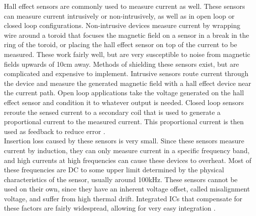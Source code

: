 \newline
Hall effect sensors are commonly used to measure current as well. These sensors can measure current intrusively or non-intrusively, as well as in open loop or closed loop configurations. Non-intrusive devices measure current by wrapping wire around a toroid that focuses the magnetic field on a sensor in a break in the ring of the toroid, or placing the hall effect sensor on top of the current to be measured. These work fairly well, but are very susceptible to noise from magnetic fields upwards of 10cm away. Methods of shielding these sensors exist, but are complicated and expensive to implement. Intrusive sensors route current through the device and measure the generated magnetic field with a hall effect device near the current path. Open loop applications take the voltage generated on the hall effect sensor and condition it to whatever output is needed. Closed loop sensors reroute the sensed current to a secondary coil that is used to generate a proportional current to the measured current. This proportional current is then used as feedback to reduce error \cite{Current_Sensing}. \\
\newline
Insertion loss caused by these sensors is very small. Since these sensors measure current by induction, they can only measure current in a specific frequency band, and high currents at high frequencies can cause these devices to overheat. Most of these frequencies are DC to some upper limit determined by the physical characteristics of the sensor, usually around 100kHz. These sensors cannot be used on their own, since they have an inherent voltage offset, called misalignment voltage, and suffer from high thermal drift. Integrated ICs that compensate for these factors are fairly widespread, allowing for very easy integration \cite{Current_Sensing}.

